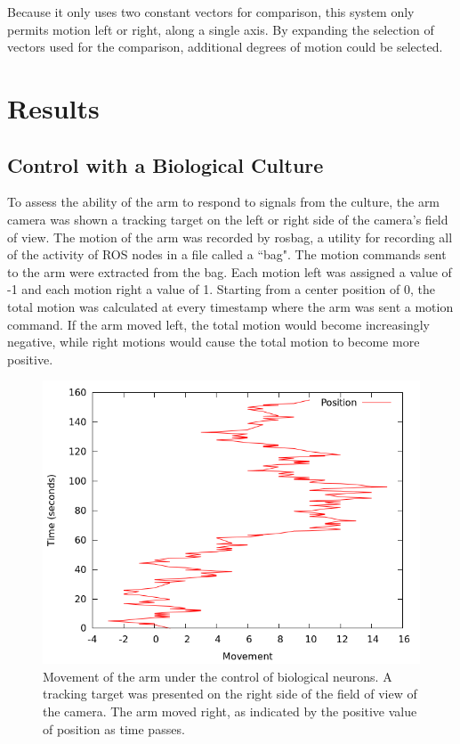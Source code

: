\documentclass[letterpaper]{article}
\begin{document}
Because it only uses two constant vectors for comparison, this system only permits motion left or right, along a single axis. 
By expanding the selection of vectors used for the comparison, additional degrees of motion could be selected. 

\section{Results}

\subsection{Control with a Biological Culture} 

To assess the ability of the arm to respond to signals from the culture, the arm camera was shown a tracking target on the left or right side of the camera's field of view.
The motion of the arm was recorded by rosbag, a utility for recording all of the activity of ROS nodes in a file called a ``bag". 
The motion commands sent to the arm were extracted from the bag. 
Each motion left was assigned a value of -1 and each motion right a value of 1. 
Starting from a center position of 0, the total motion was calculated at every timestamp where the arm was sent a motion command. 
If the arm moved left, the total motion would become increasingly negative, while right motions would cause the total motion to become more positive. 

\begin{figure}
	\centering
	\includegraphics[width=\linewidth]{bio_motion_445.png}
	\caption{Movement of the arm under the control of biological neurons. A tracking target was presented on the right side of the field of view of the camera. The arm moved right, as indicated by the positive value of position as time passes.}
	\label{fig:bio_motion_right}
\end{figure}
\end{document}
